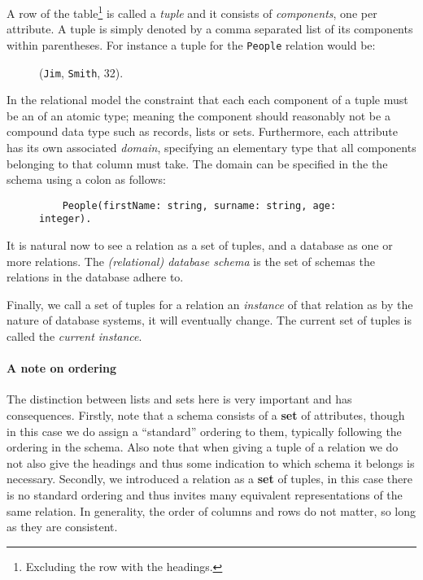 A row of the table\footnote{Excluding the row with the headings.} is called a \emph{tuple} and it consists of \emph{components}, one per attribute. A tuple is simply denoted by a comma separated list of its components within parentheses. For instance a tuple for the \verb|People| relation would be:
\begin{figure}[!h]
  \centering
  (\verb|Jim|, \verb|Smith|, 32).
\end{figure}

In the relational model the constraint that each each component of a tuple must be an of an atomic type; meaning the component should reasonably not be a compound data type such as records, lists or sets. Furthermore, each attribute has its own associated \emph{domain}, specifying an elementary type that all components belonging to that column must take. The domain can be specified in the the schema using a colon as follows:
\begin{figure}[!h]
  \begin{verbatim}
    People(firstName: string, surname: string, age: integer).
  \end{verbatim}
\end{figure}

It is natural now to see a relation as a set of tuples, and a database as one or more relations. The \emph{(relational) database schema} is the set of schemas the relations in the database adhere to.\cite{DatabaseSystems}

Finally, we call a set of tuples for a relation an \emph{instance} of that relation as by the nature of database systems, it will eventually change. The current set of tuples is called the \emph{current instance}.\cite{DatabaseSystems}

\paragraph{A note on ordering} The distinction between lists and sets here is very important and has consequences. Firstly, note that a schema consists of a \textbf{set} of attributes, though in this case we do assign a ``standard'' ordering to them, typically following the ordering in the schema. Also note that when giving a tuple of a relation we do not also give the headings and thus some indication to which schema it belongs is necessary. Secondly, we introduced a relation as a \textbf{set} of tuples, in this case there is no standard ordering and thus invites many equivalent representations of the same relation.\cite{DatabaseSystems} In generality, the order of columns and rows do not matter, so long as they are consistent.

